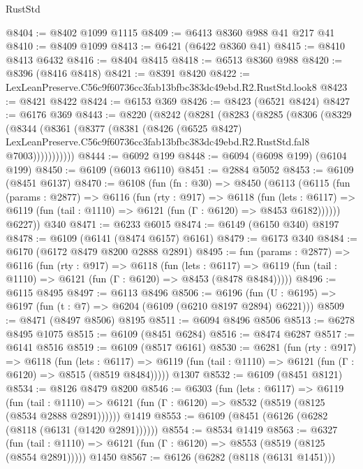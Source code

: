 \begin{lexlean}{RustStd}
\begin{coremodule}
@8404 := @8402 @1099 @1115
@8409 := @6413 @8360 @988 @41 @217 @41
@8410 := @8409 @1099
@8413 := @6421 (@6422 @8360 @41)
@8415 := @8410 @8413 @6432
@8416 := @8404 @8415
@8418 := @6513 @8360 @988
@8420 := @8396 (@8416 @8418)
@8421 := @8391 @8420
@8422 := LexLeanPreserve.C56c9f60736cc3fab13bfbc383dc49ebd.R2.RustStd.look8
@8423 := @8421 @8422
@8424 := @6153 @369
@8426 := @8423 (@6521 @8424)
@8427 := @6176 @369
@8443 := @8220
    (@8242
      (@8281
        (@8283
          (@8285
            (@8306
              (@8329
                (@8344
                  (@8361
                    (@8377
                      (@8381
                        (@8426
                          (@6525 @8427)
                          LexLeanPreserve.C56c9f60736cc3fab13bfbc383dc49ebd.R2.RustStd.fal8
                          @7003)))))))))))
@8444 := @6092 @199
@8448 := @6094 (@6098 @199) (@6104 @199)
@8450 := @6109 (@6013 @6110)
@8451 := @2884 @5052
@8453 := @6109 (@8451 @6137)
@8470 := @6108
    (fun (fn : @30) =>
    @8450
      (@6113
        (@6115
          (fun (params : @2877) =>
          @6116
            (fun (rty : @917) =>
            @6118
              (fun (lets : @6117) =>
              @6119 (fun (tail : @1110) => @6121 (fun (Γ : @6120) => @8453 @6182))))))
        @6227))
    @340
@8471 := @6233 @6015
@8474 := @6149 (@6150 @340) @8197
@8478 := @6109 (@6141 (@8474 @6157) @6161)
@8479 := @6173 @340
@8484 := @6170 (@6172 @8479 @8200 @2888 @2891)
@8495 := fun (params : @2877) =>
  @6116
    (fun (rty : @917) =>
    @6118
      (fun (lets : @6117) =>
      @6119 (fun (tail : @1110) => @6121 (fun (Γ : @6120) => @8453 (@8478 @8484)))))
@8496 := @6115 @8495
@8497 := @6113 @8496
@8506 := @6196 (fun (U : @6195) => @6197 (fun (t : @7) => @6204 (@6109 (@6210 @8197 @2894) @6221)))
@8509 := @8471 (@8497 @8506) @8195
@8511 := @6094 @8496 @8506
@8513 := @6278 @8495 @1075
@8515 := @6109 (@8451 @6284)
@8516 := @8474 @6287
@8517 := @6141 @8516
@8519 := @6109 (@8517 @6161)
@8530 := @6281
    (fun (rty : @917) =>
    @6118
      (fun (lets : @6117) =>
      @6119 (fun (tail : @1110) => @6121 (fun (Γ : @6120) => @8515 (@8519 @8484)))))
    @1307
@8532 := @6109 (@8451 @8121)
@8534 := @8126 @8479 @8200
@8546 := @6303
    (fun (lets : @6117) =>
    @6119
      (fun (tail : @1110) => @6121 (fun (Γ : @6120) => @8532 (@8519 (@8125 (@8534 @2888 @2891))))))
    @1419
@8553 := @6109 (@8451 (@6126 (@6282 (@8118 (@6131 (@1420 @2891))))))
@8554 := @8534 @1419
@8563 := @6327
    (fun (tail : @1110) => @6121 (fun (Γ : @6120) => @8553 (@8519 (@8125 (@8554 @2891)))))
    @1450
@8567 := @6126 (@6282 (@8118 (@6131 @1451)))

\end{coremodule}
\end{lexlean}
